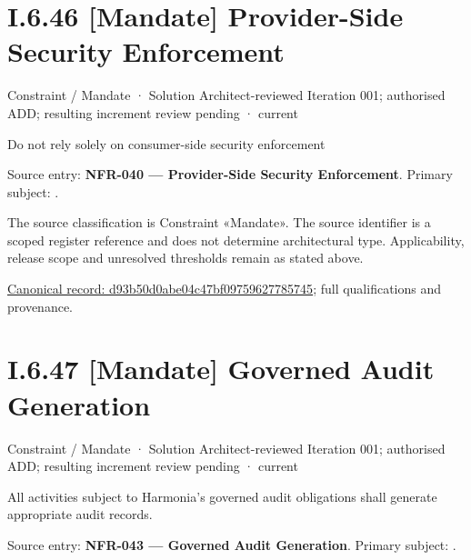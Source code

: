 \section*{I.6.46 [Mandate] Provider-Side Security Enforcement}
\label{navigation:I.6.46}

\label{element:d93b50d0abe04c47bf09759627785745}
{\small Constraint / Mandate · Solution Architect-reviewed Iteration 001; authorised ADD; resulting increment review pending · current}\par

Do not rely solely on consumer-side security enforcement



Source entry: \textbf{NFR-040 — Provider-Side Security Enforcement}. Primary subject: \texttt{}.



The source classification is Constraint «Mandate». The source identifier is a scoped register reference and does not determine architectural type. Applicability, release scope and unresolved thresholds remain as stated above.


{\footnotesize \href{../../../../../../../../continuum/motivation/constraint/mandate/d93b50d0abe04c47bf09759627785745.md}{Canonical record: d93b50d0abe04c47bf09759627785745}; full qualifications and provenance.}\par
\section*{I.6.47 [Mandate] Governed Audit Generation}
\label{navigation:I.6.47}

\label{element:d388ee6fb1d24ca886b2802cfb42c30e}
{\small Constraint / Mandate · Solution Architect-reviewed Iteration 001; authorised ADD; resulting increment review pending · current}\par

All activities subject to Harmonia's governed audit obligations shall generate appropriate audit records.



Source entry: \textbf{NFR-043 — Governed Audit Generation}. Primary subject: \texttt{}.




